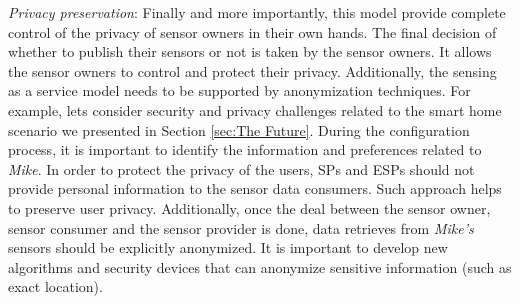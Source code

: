\documentclass[times]{ettauth}
\newenvironment{noindlist}
 {\begin{list}{\labelitemi}{\leftmargin=1.2em \itemindent=-.5em}}
 {\end{list}}
\begin{document}
\begin{noindlist}
\item  \textit{Privacy preservation}: Finally and more importantly, this model provide complete control of the privacy of sensor owners in  their own hands. The final decision of whether to publish their sensors or not is taken by the sensor owners. It allows the sensor owners to control and protect their privacy. Additionally, the sensing as a service model needs to be supported by anonymization techniques. For example, lets consider security and privacy challenges \cite{P636} related to the  smart home scenario we presented in Section \ref{sec:The Future}. During the configuration process, it is important to identify the information and preferences related to \textit{Mike}. In order to protect the  privacy of the users, SPs and ESPs should not provide personal information to the sensor data consumers. Such approach helps to preserve user privacy. Additionally, once the deal between the sensor owner, sensor consumer and the sensor provider is done, data retrieves from  \textit{Mike's} sensors should be explicitly anonymized. It is important to develop new algorithms and security devices that can anonymize sensitive information (such as exact location).






































\end{noindlist}
\end{document}
